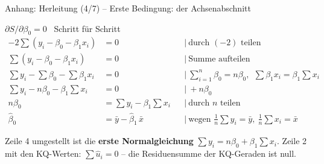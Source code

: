 \documentclass[aspectratio=169,11pt]{beamer}
\newcommand{\tsum}{\textstyle\sum}
\begin{document}
\begin{frame}{Anhang: Herleitung (4/7) -- Erste Bedingung: der Achsenabschnitt}
  \begin{block}{$\partial S / \partial \beta_0 = 0$ \ Schritt für Schritt}
    \vspace{-8pt}
    \begin{align*}
      -2\tsum (y_i - \beta_0 - \beta_1 x_i) &= 0
        && \mid\ \text{durch } (-2) \text{ teilen} \\
      \tsum (y_i - \beta_0 - \beta_1 x_i) &= 0
        && \mid\ \text{Summe aufteilen} \\
      \tsum y_i - \tsum \beta_0 - \tsum \beta_1 x_i &= 0
        && \mid\ \tsum_{i=1}^{n} \beta_0 = n\beta_0, \ \ \tsum \beta_1 x_i = \beta_1 \tsum x_i \\
      \tsum y_i - n\beta_0 - \beta_1 \tsum x_i &= 0
        && \mid\ + n\beta_0 \\
      n\beta_0 &= \tsum y_i - \beta_1 \tsum x_i
        && \mid\ \text{durch } n \text{ teilen} \\
      \hat{\beta}_0 &= \bar{y} - \hat{\beta}_1\,\bar{x}
        && \mid\ \text{wegen } \tfrac{1}{n}\tsum y_i = \bar{y}, \ \tfrac{1}{n}\tsum x_i = \bar{x}
    \end{align*}
    \vspace{-14pt}
  \end{block}

  \footnotesize Zeile 4 umgestellt ist die \textbf{erste Normalgleichung}
  $\sum y_i = n\beta_0 + \beta_1 \sum x_i$. Zeile 2 mit den KQ-Werten:
  $\sum \hat{u}_i = 0$ -- die Residuensumme der KQ-Geraden ist null.
\end{frame}
\end{document}
